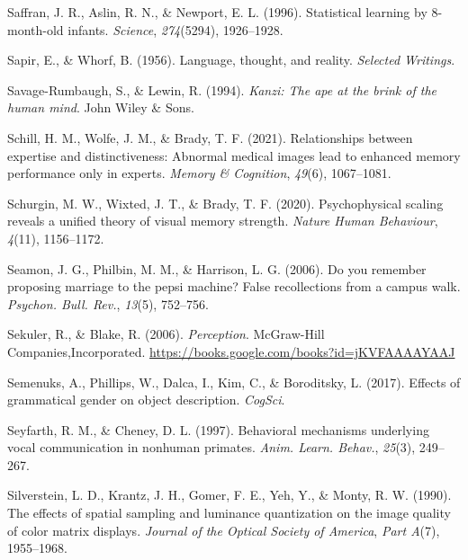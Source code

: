 \documentclass[
]{krantz}
\newlength{\cslhangindent}
\newlength{\cslentryspacingunit} %
\newenvironment{CSLReferences}[2] %
 {%
  \setlength{\parindent}{0pt}
  \ifodd #1
  \let\oldpar\par
  \def\par{\hangindent=\cslhangindent\oldpar}
  \fi
  \setlength{\parskip}{#2\cslentryspacingunit}
 }%
 {}
\begin{document}
\begin{CSLReferences}{1}{0}
\leavevmode{}%
Saffran, J. R., Aslin, R. N., \& Newport, E. L. (1996). Statistical learning by 8-month-old infants. \emph{Science}, \emph{274}(5294), 1926--1928.

\leavevmode{}%
Sapir, E., \& Whorf, B. (1956). Language, thought, and reality. \emph{Selected Writings}.

\leavevmode{}%
Savage-Rumbaugh, S., \& Lewin, R. (1994). \emph{Kanzi: The ape at the brink of the human mind}. John Wiley \& Sons.

\leavevmode{}%
Schill, H. M., Wolfe, J. M., \& Brady, T. F. (2021). Relationships between expertise and distinctiveness: Abnormal medical images lead to enhanced memory performance only in experts. \emph{Memory \& Cognition}, \emph{49}(6), 1067--1081.

\leavevmode{}%
Schurgin, M. W., Wixted, J. T., \& Brady, T. F. (2020). Psychophysical scaling reveals a unified theory of visual memory strength. \emph{Nature Human Behaviour}, \emph{4}(11), 1156--1172.

\leavevmode{}%
Seamon, J. G., Philbin, M. M., \& Harrison, L. G. (2006). Do you remember proposing marriage to the pepsi machine? False recollections from a campus walk. \emph{Psychon. Bull. Rev.}, \emph{13}(5), 752--756.

\leavevmode{}%
Sekuler, R., \& Blake, R. (2006). \emph{Perception}. McGraw-Hill Companies,Incorporated. \url{https://books.google.com/books?id=jKVFAAAAYAAJ}

\leavevmode{}%
Semenuks, A., Phillips, W., Dalca, I., Kim, C., \& Boroditsky, L. (2017). Effects of grammatical gender on object description. \emph{CogSci}.

\leavevmode{}%
Seyfarth, R. M., \& Cheney, D. L. (1997). Behavioral mechanisms underlying vocal communication in nonhuman primates. \emph{Anim. Learn. Behav.}, \emph{25}(3), 249--267.

\leavevmode{}%
Silverstein, L. D., Krantz, J. H., Gomer, F. E., Yeh, Y., \& Monty, R. W. (1990). The effects of spatial sampling and luminance quantization on the image quality of color matrix displays. \emph{Journal of the Optical Society of America}, \emph{Part A}(7), 1955--1968.


\end{CSLReferences}
\end{document}
